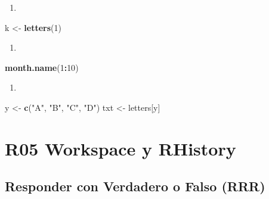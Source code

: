 \documentclass[]{book}
\newenvironment{Shaded}{\begin{snugshade}}{\end{snugshade}}
\newcommand{\DecValTok}[1]{\textcolor[rgb]{0.00,0.00,0.81}{#1}}
\newcommand{\KeywordTok}[1]{\textcolor[rgb]{0.13,0.29,0.53}{\textbf{#1}}}
\newcommand{\NormalTok}[1]{#1}
\newcommand{\OperatorTok}[1]{\textcolor[rgb]{0.81,0.36,0.00}{\textbf{#1}}}
\newcommand{\StringTok}[1]{\textcolor[rgb]{0.31,0.60,0.02}{#1}}
\begin{document}
\begin{enumerate}
\def\labelenumi{\arabic{enumi}.}
\item
\end{enumerate}

\begin{Shaded}
\begin{Highlighting}[]
\NormalTok{k <-}\StringTok{ }\KeywordTok{letters}\NormalTok{(}\DecValTok{1}\NormalTok{)}
\end{Highlighting}
\end{Shaded}

\begin{enumerate}
\def\labelenumi{\arabic{enumi}.}
\setcounter{enumi}{1}
\item
\end{enumerate}

\begin{Shaded}
\begin{Highlighting}[]
\KeywordTok{month.name}\NormalTok{(}\DecValTok{1}\OperatorTok{:}\DecValTok{10}\NormalTok{)}
\end{Highlighting}
\end{Shaded}

\begin{enumerate}
\def\labelenumi{\arabic{enumi}.}
\setcounter{enumi}{2}
\item
\end{enumerate}

\begin{Shaded}
\begin{Highlighting}[]
\NormalTok{y <-}\StringTok{ }\KeywordTok{c}\NormalTok{(}\StringTok{"A"}\NormalTok{, }\StringTok{"B"}\NormalTok{, }\StringTok{"C"}\NormalTok{, }\StringTok{"D"}\NormalTok{)}
\NormalTok{txt <-}\StringTok{ }\NormalTok{letters[y]}
\end{Highlighting}
\end{Shaded}

\hypertarget{r05-workspace-y-rhistory}{%
\chapter*{R05 Workspace y RHistory}\label{r05-workspace-y-rhistory}}

\hypertarget{responder-con-verdadero-o-falso-rrr}{%
\section{Responder con Verdadero o Falso (RRR)}\label{responder-con-verdadero-o-falso-rrr}}
\end{document}
